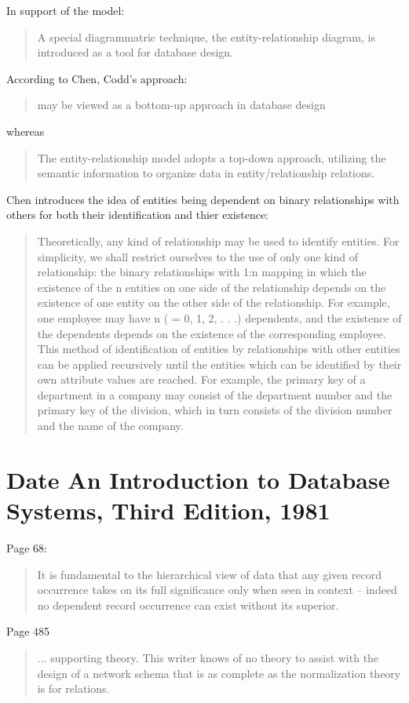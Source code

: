 \documentclass[10pt,a4paper]{scrartcl}
\begin{document}
In support of the model:
\begin{quote}
A special diagrammatric technique, the entity-relationship diagram, is introduced as a tool for database design. 
\end{quote}

According to Chen, Codd's approach:
\begin{quote}
may be viewed as a bottom-up approach in database design 
\end{quote}
whereas 
\begin{quote}
The entity-relationship model adopts a top-down approach, utilizing the semantic information to organize
data in entity/relationship relations.
\end{quote}

Chen   introduces the idea of entities being dependent on binary relationships 
with others for both their identification and thier existence:
\begin{quote}
Theoretically, any kind of relationship may be used to identify entities. For
simplicity, we shall restrict ourselves to the use of only one kind of relationship:
the binary relationships with 1:n mapping in which the existence of the n entities
on one side of the relationship depends on the existence of one entity on the other
side of the relationship. For example, one employee may have n ( = 0, 1, 2, . . .)
dependents, and the existence of the dependents depends on the existence of the
corresponding employee.
This method of identification of entities by relationships with other entities can
be applied recursively until the entities which can be identified by their own attribute
values are reached. For example, the primary key of a department in a
company may consist of the department number and the primary key of the
division, which in turn consists of the division number and the name of the company.
\end{quote}

\section{Date An Introduction to Database Systems, Third Edition, 1981}
Page 68:
\begin{quote}
It is fundamental to the hierarchical view of data that any given record occurrence takes on its full significance only when seen in context -- indeed no dependent record occurrence can exist without its superior.
\end{quote}

Page 485
\begin{quote}
... supporting theory. This writer knows of no theory to assist with the design of a network schema that is as complete as the normalization theory is for relations.
\end{quote}
\end{document}

